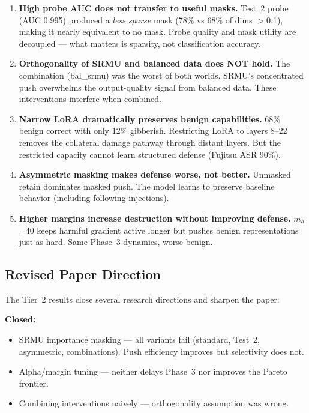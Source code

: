 \documentclass[11pt]{article}
\begin{document}
\begin{enumerate}
  \item \textbf{High probe AUC does not transfer to useful masks.}
        Test~2 probe (AUC 0.995) produced a \emph{less sparse} mask (78\%
        vs 68\% of dims $>$0.1), making it nearly equivalent to no mask.
        Probe quality and mask utility are decoupled --- what matters is
        sparsity, not classification accuracy.

  \item \textbf{Orthogonality of SRMU and balanced data does NOT hold.}
        The combination (bal\_srmu) was the worst of both worlds.  SRMU's
        concentrated push overwhelms the output-quality signal from balanced
        data.  These interventions interfere when combined.

  \item \textbf{Narrow LoRA dramatically preserves benign capabilities.}
        68\% benign correct with only 12\% gibberish.  Restricting LoRA
        to layers 8--22 removes the collateral damage pathway through
        distant layers.  But the restricted capacity cannot learn
        structured defense (Fujitsu ASR 90\%).

  \item \textbf{Asymmetric masking makes defense worse, not better.}
        Unmasked retain dominates masked push.  The model learns to
        preserve baseline behavior (including following injections).

  \item \textbf{Higher margins increase destruction without improving
        defense.}  $m_h$=40 keeps harmful gradient active longer but
        pushes benign representations just as hard.  Same Phase~3
        dynamics, worse benign.
\end{enumerate}

\subsection{Revised Paper Direction}

The Tier~2 results close several research directions and sharpen the paper:

\textbf{Closed:}
\begin{itemize}
  \item SRMU importance masking --- all variants fail (standard, Test~2,
        asymmetric, combinations).  Push efficiency improves but
        selectivity does not.
  \item Alpha/margin tuning --- neither delays Phase~3 nor improves
        the Pareto frontier.
  \item Combining interventions naively --- orthogonality assumption
        was wrong.
\end{itemize}
\end{document}
